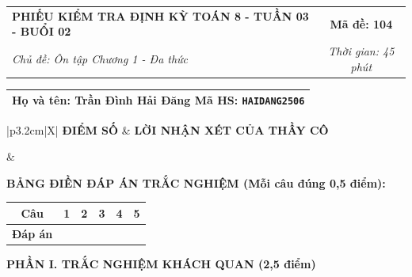 \documentclass[12pt,a4paper]{article}
\begin{document}
\newpage


\noindent
\begin{tabularx}{\linewidth}{|X|c|}
\hline
\textbf{PHIẾU KIỂM TRA ĐỊNH KỲ TOÁN 8 - TUẦN 03 - BUỔI 02} & \textbf{Mã đề: 104} \\
\textit{Chủ đề: Ôn tập Chương 1 - Đa thức} & \textit{Thời gian: 45 phút} \\
\hline
\end{tabularx}

\vspace{1mm}

\noindent
\begin{tabularx}{\linewidth}{|X|}
\hline
\rule[-2mm]{0pt}{7.5mm}\textbf{Họ và tên:} \textbf{\large Trần Đình Hải Đăng} \hfill \textbf{Mã HS:} \texttt{HAIDANG2506} \quad \\
\hline
\end{tabularx}

\vspace{1mm}

\noindent
\begin{tabularx}{\linewidth}{|p{3.2cm}|X|}
\hline
\centering\textbf{ĐIỂM SỐ} & \centering\textbf{LỜI NHẬN XÉT CỦA THẦY CÔ} \tabularnewline
\hline
\rule{0pt}{1.3cm} & \tabularnewline
\hline
\end{tabularx}

\vspace{1.2mm}

\noindent\textbf{BẢNG ĐIỀN ĐÁP ÁN TRẮC NGHIỆM (Mỗi câu đúng 0,5 điểm):}
\vspace{0.8mm}

\noindent
\renewcommand{\arraystretch}{1.35}
\begin{tabularx}{\linewidth}{|c|*{5}{>{\centering\arraybackslash}X|}}
\hline
\textbf{Câu} & \textbf{1} & \textbf{2} & \textbf{3} & \textbf{4} & \textbf{5} \\
\hline
\textbf{Đáp án} & & & & & \\
\hline
\end{tabularx}
\renewcommand{\arraystretch}{1.0}

\vspace{1.5mm}

\noindent\textbf{\large PHẦN I. TRẮC NGHIỆM KHÁCH QUAN (2,5 điểm)}
\vspace{1mm}
\end{document}
